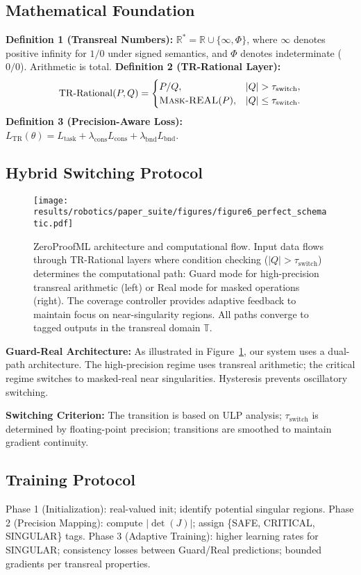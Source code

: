 \documentclass[twoside,11pt]{article}
\newcommand{\TR}{\mathbb{T}}
\newcommand{\RR}{\mathbb{R}}
\newcommand{\maskreal}{\textsc{Mask-REAL}}
\newcommand{\condswitch}{\mbox{$|Q|\!>\!\tau_{\mathrm{switch}}$}}
\begin{document}
\subsection{Mathematical Foundation}
\textbf{Definition 1 (Transreal Numbers):} $\RR^\ast=\RR\cup\{\infty,\Phi\}$, where $\infty$ denotes positive infinity for $1/0$ under signed semantics, and $\Phi$ denotes indeterminate ($0/0$). Arithmetic is total.
\newline
\textbf{Definition 2 (TR-Rational Layer):}
\[\mathrm{TR\text{-}Rational}(P,Q)=
\begin{cases}
P/Q, & |Q|>\tau_{\mathrm{switch}},\\
\maskreal(P), & |Q|\le \tau_{\mathrm{switch}}.
\end{cases}\]
\textbf{Definition 3 (Precision-Aware Loss):} $L_{\mathrm{TR}}(\theta)=L_{\mathrm{task}}+\lambda_{\mathrm{cons}}L_{\mathrm{cons}}+\lambda_{\mathrm{bnd}}L_{\mathrm{bnd}}$.
\subsection{Hybrid Switching Protocol}

\begin{figure}[t]
\centering
\texttt{[image: results/robotics/paper\_suite/figures/figure6\_perfect\_schematic.pdf]}
\caption{ZeroProofML architecture and computational flow. Input data flows through TR-Rational layers where condition checking (\condswitch) determines the computational path: Guard mode for high-precision transreal arithmetic (left) or Real mode for masked operations (right). The coverage controller provides adaptive feedback to maintain focus on near-singularity regions. All paths converge to tagged outputs in the transreal domain $\TR$.}
\label{fig:zeroproofml_schematic}
\end{figure}

\textbf{Guard-Real Architecture:} As illustrated in Figure~\ref{fig:zeroproofml_schematic}, our system uses a dual-path architecture. The high-precision regime uses transreal arithmetic; the critical regime switches to masked-real near singularities. Hysteresis prevents oscillatory switching. 

\textbf{Switching Criterion:} The transition is based on ULP analysis; $\tau_{\mathrm{switch}}$ is determined by floating-point precision; transitions are smoothed to maintain gradient continuity.
\subsection{Training Protocol}
Phase 1 (Initialization): real-valued init; identify potential singular regions.
Phase 2 (Precision Mapping): compute $|\det(J)|$; assign \{SAFE, CRITICAL, SINGULAR\} tags.
Phase 3 (Adaptive Training): higher learning rates for SINGULAR; consistency losses between Guard/Real predictions; bounded gradients per transreal properties.
\end{document}
